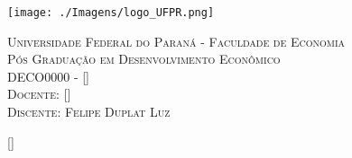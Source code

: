 \documentclass[a4paper, 11pt]{article}
\begin{document}
	
	
	\colorbox{white!10!}{
		\begin{minipage}[l]{0.169 \textwidth}
			\begin{flushleft}
				\texttt{[image: ./Imagens/logo\_UFPR.png]}
			\end{flushleft}
		\end{minipage}
		\begin{minipage}[l]{0.75 \textwidth}
			\begin{flushleft}
				{\large \textsc{Universidade Federal do Paraná - Faculdade de Economia}}
				\\
				{\large \textsc{Pós Graduação em Desenvolvimento Econômico}}
				\\
				\large \textsc{DECO0000 - []}
				\\
				\large \textsc{Docente: []}
				\\
				\large \textsc{Discente: Felipe Duplat Luz}
			\end{flushleft}
		\end{minipage}
	}
	


\fancyhf{}
\pagestyle{fancy}
\renewcommand{\footrulewidth}{0.1mm}
\renewcommand{\headrulewidth}{0.0mm}
\fancyfoot[R]{\thepage}

\fancypagestyle{plain}{
	\fancyhf{}
	\renewcommand{\footrulewidth}{0.1mm}
	\fancyfoot[R]{\thepage}
	\renewcommand{\headrulewidth}{empty}}


[]


\nocite{sotomayor21, dolevchenko09}







\end{document}
